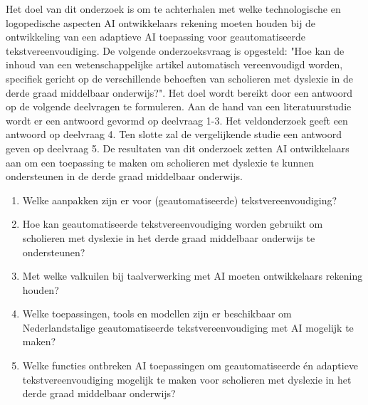 Het doel van dit onderzoek is om te achterhalen met welke technologische en logopedische aspecten AI ontwikkelaars rekening moeten houden bij de ontwikkeling van een adaptieve AI toepassing voor geautomatiseerde tekstvereenvoudiging. De volgende onderzoeksvraag is opgesteld: "Hoe kan de inhoud van een wetenschappelijke artikel automatisch vereenvoudigd worden, specifiek gericht op de verschillende behoeften van scholieren met dyslexie in de derde graad middelbaar onderwijs?". Het doel wordt bereikt door een antwoord op de volgende deelvragen te formuleren. Aan de hand van een literatuurstudie wordt er een antwoord gevormd op deelvraag 1-3. Het veldonderzoek geeft een antwoord op deelvraag 4. Ten slotte zal de vergelijkende studie een antwoord geven op deelvraag 5. De resultaten van dit onderzoek zetten AI ontwikkelaars aan om een toepassing te maken om scholieren met dyslexie te kunnen ondersteunen in de derde graad middelbaar onderwijs.

\begin{enumerate}
	\item Welke aanpakken zijn er voor (geautomatiseerde) tekstvereenvoudiging?
	\item Hoe kan geautomatiseerde tekstvereenvoudiging worden gebruikt om scholieren met dyslexie in het derde graad middelbaar onderwijs te ondersteunen?
	\item Met welke valkuilen bij taalverwerking met AI moeten ontwikkelaars rekening houden?
	\item Welke toepassingen, tools en modellen zijn er beschikbaar om Nederlandstalige geautomatiseerde tekstvereenvoudiging met AI mogelijk te maken?
	\item Welke functies ontbreken AI toepassingen om geautomatiseerde én adaptieve tekstvereenvoudiging mogelijk te maken voor scholieren met dyslexie in het derde graad middelbaar onderwijs?
\end{enumerate}



